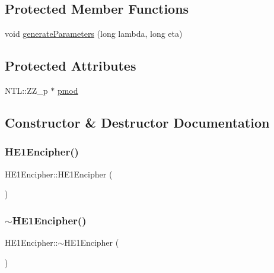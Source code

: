 \subsection*{Protected Member Functions}
\begin{DoxyCompactItemize}
\item 
void \hyperlink{classHE1Encipher_a4ec1a767a1a3f4e71fa368dc99f6afd8}{generate\+Parameters} (long lambda, long eta)
\end{DoxyCompactItemize}
\subsection*{Protected Attributes}
\begin{DoxyCompactItemize}
\item 
N\+T\+L\+::\+Z\+Z\+\_\+p $\ast$ \hyperlink{classHE1Encipher_a4fa8ff49fc93cf01a0814aa83141e725}{pmod}
\end{DoxyCompactItemize}


\subsection{Constructor \& Destructor Documentation}
\mbox{\label{classHE1Encipher_ad9128098166937e3569c4414aa1af689}} 
\subsubsection{\texorpdfstring{H\+E1\+Encipher()}{HE1Encipher()}}
{\footnotesize\ttfamily H\+E1\+Encipher\+::\+H\+E1\+Encipher (\begin{DoxyParamCaption}{ }\end{DoxyParamCaption})}

\mbox{\label{classHE1Encipher_a5ffc18928bd189107151cb5a16c8cc5c}} 
\subsubsection{\texorpdfstring{$\sim$\+H\+E1\+Encipher()}{~HE1Encipher()}}
{\footnotesize\ttfamily H\+E1\+Encipher\+::$\sim$\+H\+E1\+Encipher (\begin{DoxyParamCaption}{ }\end{DoxyParamCaption})\hspace{0.3cm}{\ttfamily [virtual]}}



